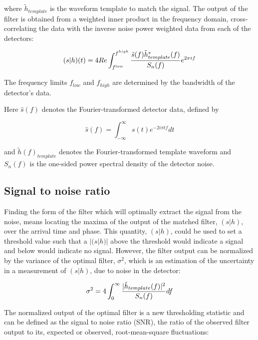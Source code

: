 \documentclass[binding=0.6cm, LaM]{sapthesis}
\begin{document}
	where $\tilde h_{template}$ is the waveform template to match the signal.
	The output of the filter is obtained from a weighted inner product in the frequency domain, 
	cross-correlating the data with the inverse noise power weighted data from each of the detectors:

		\begin{equation}
 			(s|h)(t) = 4Re \int^{f^{high}}_{f^{low}} {{\tilde s (f) \tilde h^{*}_{template}(f)} \over {S_n (f)}} e^{2 \pi if} 
		\end{equation}

	The frequency limits $f_{low}$ and $f_{high}$ are determined by the bandwidth of the detector’s data.

	Here $\hat s(f)$ denotes the Fourier-transformed detector data, defined by

		\begin{equation}
			\hat s(f) = \int^{\infty}_{-\infty} s(t) e^{-2i \pi tf} dt
		\end{equation}

	and $\tilde h(f)_{template}$ denotes the Fourier-transformed template waveform 
	and $S_n(f)$ is the one-sided power spectral density of the detector noise. 
  
\subsection{Signal to noise ratio}

	Finding the form of the filter which will optimally extract the signal from the noise,
        means locating the maxima of the output of the matched filter, $(s|h)$, 
	over the arrival time and phase.
        This quantity, $(s|h)$, could be used to set a threshold value such that 
	a $|(s|h)|$ above the threshold would indicate a signal
	and below would indicate no signal. 
	However, the filter output can be normalized by the variance of the optimal filter, $\sigma^2$,
	which is an estimation of the uncertainty in a measurement of $(s|h)$, due to noise in the detector:

                \begin{equation}
                        \sigma^2 =4 \int^{\infty}_{0} {{|\tilde h_{template}(f)|^2} \over {S_n(f)}}df
                \end{equation}

 	The normalized output of the optimal filter is a new thresholding statistic and can be defined as  
	the signal to noise ratio (SNR), the ratio of the observed filter output to its,
        expected or observed, root-mean-square fluctuations:
\end{document}
